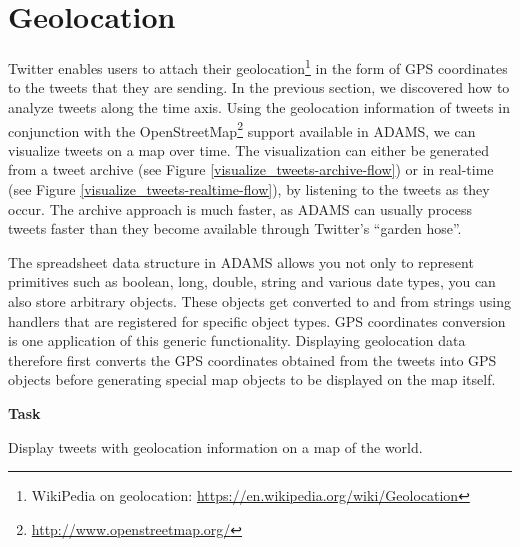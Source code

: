 \documentclass[a4paper,10pt]{book}
\newcommand{\heading}[1]{
  \vspace{0.3cm} \noindent \textbf{#1} \newline
}
\begin{document}
\clearpage
\newpage
\section{Geolocation}
Twitter enables users to attach their geolocation\footnote{WikiPedia on geolocation: \url{https://en.wikipedia.org/wiki/Geolocation}{}} in the form of GPS coordinates to the tweets that they are sending. In the previous section, we discovered how to analyze tweets along the time axis. Using the geolocation information of tweets in conjunction with the OpenStreetMap\footnote{\url{http://www.openstreetmap.org/}{}} support available in ADAMS, we can visualize tweets on a map over time. The visualization can either be generated from a tweet archive (see Figure \ref{visualize_tweets-archive-flow}) or in real-time (see Figure \ref{visualize_tweets-realtime-flow}), by listening to the tweets as they occur. The archive approach is much faster, as ADAMS can usually process tweets faster than they become available through Twitter's ``garden hose''.

The spreadsheet data structure in ADAMS allows you not only to represent primitives such as boolean, long, double, string and various date types, you can also store arbitrary objects. These objects get converted to and from strings using handlers that are registered for specific object types. GPS coordinates conversion is one application of this generic functionality. Displaying geolocation data therefore first converts the GPS coordinates obtained from the tweets into GPS objects before generating special map objects to be displayed on the map itself.

\heading{Task}
Display tweets with geolocation information on a map of the world.
\end{document}
